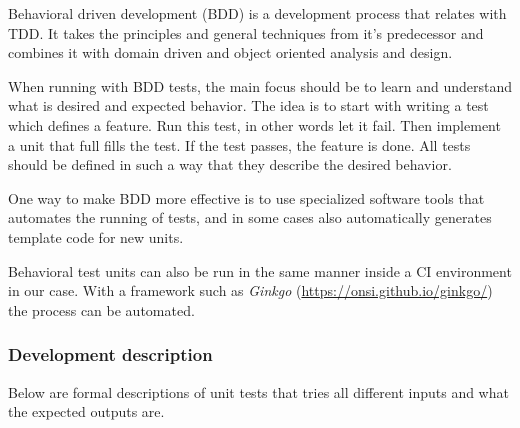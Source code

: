 \documentclass[a4paper,15pt,twoside]{article}
\begin{document}
Behavioral driven development (BDD) is a development process that relates with TDD. It takes the principles and general techniques from it's predecessor and combines it with domain driven and object oriented analysis and design. 

When running with BDD tests, the main focus should be to learn and understand what is desired and expected behavior. The idea is to start with writing a test which defines a feature. Run this test, in other words let it fail. Then implement a unit that full fills the test. If the test passes, the feature is done. All tests should be defined in such a way that they describe the desired behavior.

One way to make BDD more effective is to use specialized software tools that automates the running of tests, and in some cases also automatically generates template code for new units.

Behavioral test units can also be run in the same manner inside a CI environment in our case. With a framework such as \emph{Ginkgo} (\url{https://onsi.github.io/ginkgo/}) the process can be automated.

\newpage
\subsubsection{Development description}
Below are formal descriptions of unit tests that tries all different inputs and what the expected outputs are.
\end{document}
